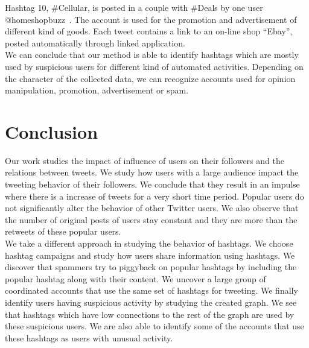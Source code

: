 \documentclass[journal, a4paper, 12pt]{article}
\begin{document}
Hashtag 10, \#Cellular, is posted in a couple with \#Deals by one user @homeshopbuzz~\cite{homeshopbuzz}. The account is used for the promotion and advertisement of different kind of goods. Each tweet contains a link to an on-line shop ``Ebay'', posted automatically through linked application.
\\
 
We can conclude that our method is able to identify hashtags which are mostly used by suspicious users for different kind of automated activities. Depending on the character of the collected data, we can recognize accounts used for opinion manipulation, promotion, advertisement or spam.





      

\section{Conclusion}
Our work studies the impact of influence of users on their followers and the relations between tweets. We study how users with a large audience impact the tweeting behavior of their followers. We conclude that they result in an impulse where there is a increase of tweets for a very short time period. Popular users do not significantly alter the behavior of other Twitter users. We also observe that the number of original posts of users stay constant and they are more than the retweets of these popular users. \\

We take a different approach in studying the behavior of hashtags. We choose hashtag campaigns and study how users share information using hashtags. We discover that spammers try to piggyback on popular hashtags by including the popular hashtag along with their content. We uncover a large group of coordinated accounts that use the same set of hashtags for tweeting. We finally identify users having suspicious activity by studying the created graph. We see that hashtags which have low connections to the rest of the graph are used by these suspicious users. We are also able to identify some of the accounts that use these hashtags as users with unusual activity.
\end{document}

